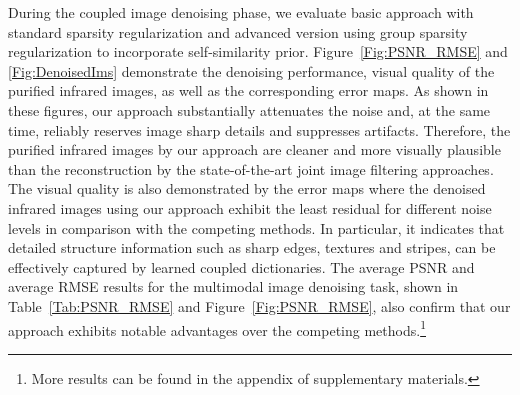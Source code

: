 \documentclass{article}
\begin{document}
During the coupled image denoising phase, we evaluate basic approach with standard sparsity regularization and advanced version using group sparsity regularization to incorporate self-similarity prior.
%
%
%
Figure~\ref{Fig:PSNR_RMSE} and \ref{Fig:DenoisedIms} demonstrate the denoising performance, visual quality of the purified infrared images, as well as the corresponding error maps. As shown in these figures, our approach substantially attenuates the noise and, at the same time, reliably reserves image sharp details and suppresses artifacts. Therefore, the purified infrared images by our approach are cleaner and more visually plausible than the reconstruction by the state-of-the-art joint image filtering approaches. The visual quality is also demonstrated by the error maps where the denoised infrared images using our approach exhibit the least residual for different noise levels in comparison with the competing methods. In particular, it indicates that detailed structure information such as sharp edges, textures and stripes, can be effectively captured by learned coupled dictionaries. The average PSNR and average RMSE results for the multimodal image denoising task, shown in Table~\ref{Tab:PSNR_RMSE} and Figure~\ref{Fig:PSNR_RMSE}, also confirm that our approach exhibits notable advantages over the competing methods.\footnote{
	More results can be found in the appendix of supplementary materials.}
\end{document}
